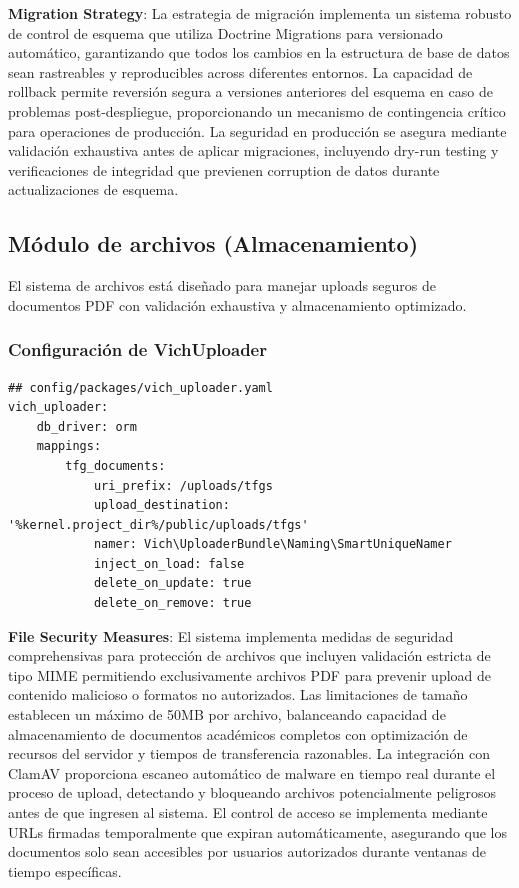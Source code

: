 \documentclass[12pt,a4paper,oneside]{report}
\begin{document}
\textbf{Migration Strategy}: La estrategia de migración implementa un sistema robusto de control de esquema que utiliza Doctrine Migrations para versionado automático, garantizando que todos los cambios en la estructura de base de datos sean rastreables y reproducibles across diferentes entornos. La capacidad de rollback permite reversión segura a versiones anteriores del esquema en caso de problemas post-despliegue, proporcionando un mecanismo de contingencia crítico para operaciones de producción. La seguridad en producción se asegura mediante validación exhaustiva antes de aplicar migraciones, incluyendo dry-run testing y verificaciones de integridad que previenen corruption de datos durante actualizaciones de esquema.

\subsection{Módulo de archivos
(Almacenamiento)}\label{muxf3dulo-de-archivos-almacenamiento}

El sistema de archivos está diseñado para manejar uploads seguros de
documentos PDF con validación exhaustiva y almacenamiento optimizado.

\subsubsection{Configuración de
VichUploader}\label{configuraciuxf3n-de-vichuploader}

\begin{lstlisting}
## config/packages/vich_uploader.yaml
vich_uploader:
    db_driver: orm
    mappings:
        tfg_documents:
            uri_prefix: /uploads/tfgs
            upload_destination: '%kernel.project_dir%/public/uploads/tfgs'
            namer: Vich\UploaderBundle\Naming\SmartUniqueNamer
            inject_on_load: false
            delete_on_update: true
            delete_on_remove: true
\end{lstlisting}

\textbf{File Security Measures}: El sistema implementa medidas de seguridad comprehensivas para protección de archivos que incluyen validación estricta de tipo MIME permitiendo exclusivamente archivos PDF para prevenir upload de contenido malicioso o formatos no autorizados. Las limitaciones de tamaño establecen un máximo de 50MB por archivo, balanceando capacidad de almacenamiento de documentos académicos completos con optimización de recursos del servidor y tiempos de transferencia razonables. La integración con ClamAV proporciona escaneo automático de malware en tiempo real durante el proceso de upload, detectando y bloqueando archivos potencialmente peligrosos antes de que ingresen al sistema. El control de acceso se implementa mediante URLs firmadas temporalmente que expiran automáticamente, asegurando que los documentos solo sean accesibles por usuarios autorizados durante ventanas de tiempo específicas.
\end{document}
